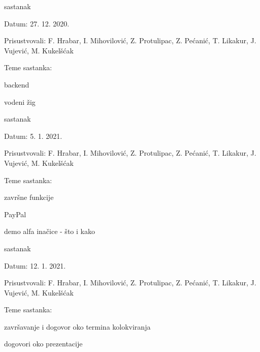 \begin{packed_enum}
\begin{packed_item}
\begin{packed_item}
					
				\end{packed_item}
			\end{packed_item}
		
			\item  sastanak
			\item[] \begin{packed_item}
				\item Datum: 27. 12. 2020.
				\item Prisustvovali: F. Hrabar, I. Mihovilović, Z. Protulipac, Z. Pećanić, T. Likakur, J. Vujević, M. Kukelšćak
				\item Teme sastanka:
				\begin{packed_item}
					\item  backend
					\item  vodeni žig
				
					
				\end{packed_item}
			\end{packed_item}
		
			\item  sastanak
			\item[] \begin{packed_item}
				\item Datum: 5. 1. 2021.
				\item Prisustvovali: F. Hrabar, I. Mihovilović, Z. Protulipac, Z. Pećanić, T. Likakur, J. Vujević, M. Kukelšćak
				\item Teme sastanka:
				\begin{packed_item}
					\item  završne funkcije
					\item  PayPal
					\item demo alfa inačice - što i kako
					
				\end{packed_item}
			\end{packed_item}
			\item  sastanak
			\item[] \begin{packed_item}
				\item Datum: 12. 1. 2021.
				\item Prisustvovali: F. Hrabar, I. Mihovilović, Z. Protulipac, Z. Pećanić, T. Likakur, J. Vujević, M. Kukelšćak
				\item Teme sastanka:
				\begin{packed_item}
					\item  završavanje i dogovor oko termina kolokviranja
					\item dogovori oko prezentacije
					
				\end{packed_item}
			\end{packed_item}
		
		\end{packed_enum}
	
